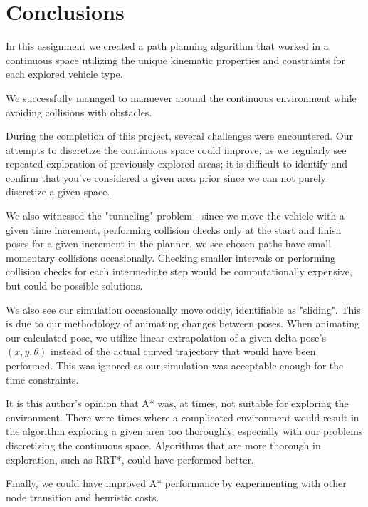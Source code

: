 \documentclass{article}
\begin{document}
\section*{Conclusions}

In this assignment we created a path planning algorithm that worked in a continuous space utilizing the unique kinematic properties and constraints for each explored vehicle type.

We successfully managed to manuever around the continuous environment while avoiding collisions with obstacles.

During the completion of this project, several challenges were encountered. Our attempts to discretize the continuous space could improve, as we regularly see repeated exploration of previously explored areas; it is difficult to identify and confirm that you've considered a given area prior since we can not purely discretize a given space.

We also witnessed the "tunneling" problem - since we move the vehicle with a given time increment, performing collision checks only at the start and finish poses for a given increment in the planner, we see chosen paths have small momentary collisions occasionally. Checking smaller intervals or performing collision checks for each intermediate step would be computationally expensive, but could be possible solutions.

We also see our simulation occasionally move oddly, identifiable as "sliding". This is due to our methodology of animating changes between poses. When animating our calculated pose, we utilize linear extrapolation of a given delta pose's $(x, y, \theta)$ instead of the actual curved trajectory that would have been performed. This was ignored as our simulation was acceptable enough for the time constraints.

It is this author's opinion that A* was, at times, not suitable for exploring the environment. There were times where a complicated environment would result in the algorithm exploring a given area too thoroughly, especially with our problems discretizing the continuous space. Algorithms that are more thorough in exploration, such as RRT*, could have performed better.

Finally, we could have improved A* performance by experimenting with other node transition and heuristic costs.
\end{document}
